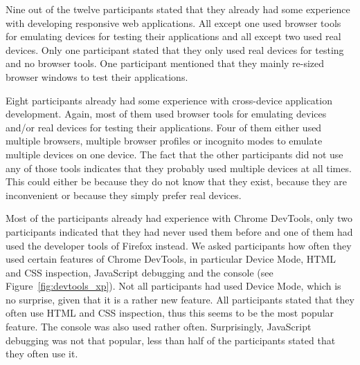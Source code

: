Nine out of the twelve participants stated that they already had some experience with developing responsive web applications. All except one used browser tools for emulating devices for testing their applications and all except two used real devices. Only one participant stated that they only used real devices for testing and no browser tools. One participant mentioned that they mainly re-sized browser windows to test their applications.

Eight participants already had some experience with cross-device application development. Again, most of them used browser tools for emulating devices and/or real devices for testing their applications. Four of them either used multiple browsers, multiple browser profiles or incognito modes to emulate multiple devices on one device. The fact that the other participants did not use any of those tools indicates that they probably used multiple devices at all times. This could either be because they do not know that they exist, because they are inconvenient or because they simply prefer real devices.

Most of the participants already had experience with Chrome DevTools, only two participants indicated that they had never used them before and one of them had used the developer tools of Firefox instead. We asked participants how often they used certain features of Chrome DevTools, in particular Device Mode, HTML and CSS inspection, JavaScript debugging and the console (see Figure~\ref{fig:devtools_xp}). Not all participants had used Device Mode, which is no surprise, given that it is a rather new feature. All participants stated that they often use HTML and CSS inspection, thus this seems to be the most popular feature. The console was also used rather often. Surprisingly, JavaScript debugging was not that popular, less than half of the participants stated that they often use it.

